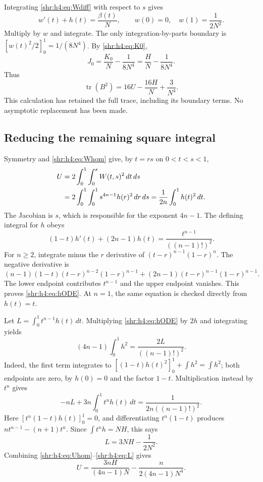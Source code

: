 \documentclass[11pt,letterpaper]{article}
\numberwithin{equation}{section}
\theoremstyle{definition}
\newcommand{\1}{\mathbf 1}
\DeclareMathOperator{\tr}{tr}
\newcommand{\dd}{\,d}
\begin{document}
Integrating \eqref{shr:h4:eq:Wdiff} with respect to $s$ gives
\[
 w'(t)+h(t)=\frac{\beta(t)}N,
 \qquad w(0)=0,\quad w(1)=\frac1{2N^2}.
\]
Multiply by $w$ and integrate. The only integration-by-parts boundary
is $[w(t)^2/2]_0^1=1/(8N^4)$. By \eqref{shr:h4:eq:K0},
\begin{equation}
 J_0=\frac{K_0}N-\frac1{8N^4}
     =\frac HN-\frac1{8N^4}.
 \label{shr:h4:eq:J0}
\end{equation}
Thus
\begin{equation}
 \tr(B^2)=16U-\frac{16H}N+\frac3{N^4}.
 \label{shr:h4:eq:trB2}
\end{equation}
This calculation has retained the full trace, including its boundary
terms. No asymptotic replacement has been made.

\subsection{Reducing the remaining square integral}
Symmetry and \eqref{shr:h4:eq:Whom} give, by $t=rs$ on $0<t<s<1$,
\begin{align}
 U&=2\int_0^1\int_0^sW(t,s)^2\dd t\dd s\notag\\
  &=2\int_0^1\int_0^1s^{4n-1}h(r)^2\dd r\dd s
   =\frac1{2n}\int_0^1h(t)^2\dd t.
 \label{shr:h4:eq:Uhom}
\end{align}
The Jacobian is $s$, which is responsible for the exponent $4n-1$.
The defining integral for $h$ obeys
\begin{equation}
 (1-t)h'(t)+(2n-1)h(t)
 =\frac{t^{n-1}}{((n-1)!)^2}.
 \label{shr:h4:eq:hODE}
\end{equation}
For $n\ge2$, integrate minus the $r$ derivative of
$(t-r)^{n-1}(1-r)^n$. The negative derivative is
\[
 (n-1)(1-t)(t-r)^{n-2}(1-r)^{n-1}
 +(2n-1)(t-r)^{n-1}(1-r)^{n-1}.
\]
The lower endpoint contributes $t^{n-1}$ and the upper endpoint vanishes.
This proves \eqref{shr:h4:eq:hODE}. At $n=1$, the same equation is checked
directly from $h(t)=t$.

Let $L=\int_0^1 t^{n-1}h(t)\dd t$. Multiplying \eqref{shr:h4:eq:hODE} by $2h$
and integrating yields
\begin{equation}
 (4n-1)\int_0^1h^2=\frac{2L}{((n-1)!)^2}.
 \label{shr:h4:eq:h2}
\end{equation}
Indeed, the first term integrates to
$[(1-t)h(t)^2]_0^1+\int h^2=\int h^2$; both endpoints are zero, by
$h(0)=0$ and the factor $1-t$.
Multiplication instead by $t^n$ gives
\[
 -nL+3n\int_0^1t^nh(t)\dd t=\frac1{2n((n-1)!)^2}.
\]
Here $[t^n(1-t)h(t)]_0^1=0$, and differentiating $t^n(1-t)$ produces
$n t^{n-1}-(n+1)t^n$. Since $\int t^nh=NH$, this says
\begin{equation}
 L=3NH-\frac1{2N^2}.
 \label{shr:h4:eq:L}
\end{equation}
Combining \eqref{shr:h4:eq:Uhom}--\eqref{shr:h4:eq:L} gives
\begin{equation}
 U=\frac{3nH}{(4n-1)N}-\frac{n}{2(4n-1)N^4}.
 \label{shr:h4:eq:UH}
\end{equation}
\end{document}
